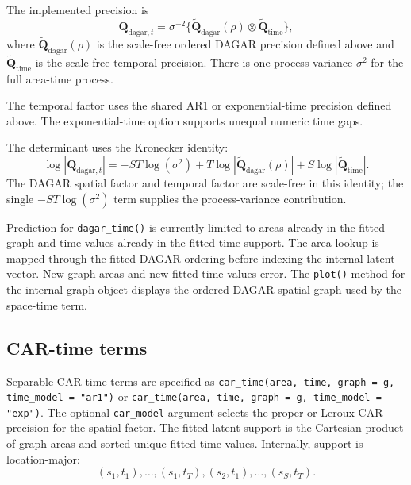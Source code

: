 \documentclass[11pt]{article}
\newcommand{\bQ}{\bm{Q}}
\begin{document}
The implemented precision is
\begin{equation}
  \bQ_{\mathrm{dagar},t}
    =
    \sigma^{-2}
    \{\widetilde{\bQ}_{\mathrm{dagar}}(\rho)
      \otimes
      \widetilde{\bQ}_{\mathrm{time}}\},
\end{equation}
where $\widetilde{\bQ}_{\mathrm{dagar}}(\rho)$ is the scale-free ordered DAGAR precision defined above and $\widetilde{\bQ}_{\mathrm{time}}$ is the scale-free temporal precision. There is one process variance $\sigma^2$ for the full area-time process.

The temporal factor uses the shared AR1 or exponential-time precision defined above. The exponential-time option supports unequal numeric time gaps.

The determinant uses the Kronecker identity:
\begin{equation}
  \label{eq:logdet-dagar-time}
  \log|\bQ_{\mathrm{dagar},t}|
    =
    -ST\log(\sigma^2)
    +
    T\log|\widetilde{\bQ}_{\mathrm{dagar}}(\rho)|
    +
    S\log|\widetilde{\bQ}_{\mathrm{time}}|.
\end{equation}
The DAGAR spatial factor and temporal factor are scale-free in this identity; the single $-ST\log(\sigma^2)$ term supplies the process-variance contribution.

Prediction for \texttt{dagar\_time()} is currently limited to areas already in the fitted graph and time values already in the fitted time support. The area lookup is mapped through the fitted DAGAR ordering before indexing the internal latent vector. New graph areas and new fitted-time values error. The \texttt{plot()} method for the internal graph object displays the ordered DAGAR spatial graph used by the space-time term.

\subsection{CAR-time terms}

Separable CAR-time terms are specified as \texttt{car\_time(area, time, graph = g, time\_model = "ar1")} or \texttt{car\_time(area, time, graph = g, time\_model = "exp")}. The optional \texttt{car\_model} argument selects the proper or Leroux CAR precision for the spatial factor. The fitted latent support is the Cartesian product of graph areas and sorted unique fitted time values. Internally, support is location-major:
\begin{equation}
  (s_1,t_1),\ldots,(s_1,t_T),(s_2,t_1),\ldots,(s_S,t_T).
\end{equation}
\end{document}
